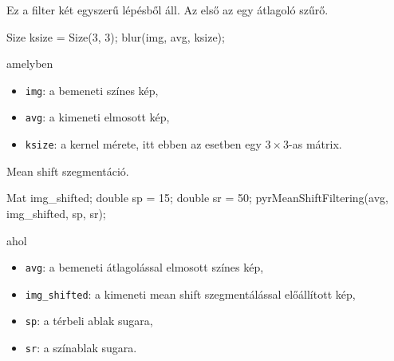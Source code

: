 Ez a filter két egyszerű lépésből áll. Az első az egy átlagoló szűrő.
\begin{cpp}
Size ksize = Size(3, 3);
blur(img, avg, ksize);
\end{cpp}
amelyben
\begin{itemize}
    \item \texttt{img}: a bemeneti színes kép,
    \item \texttt{avg}: a kimeneti elmosott kép,
    \item \texttt{ksize}: a kernel mérete, itt ebben az esetben egy $3 \times 3$-as mátrix.
\end{itemize}
Mean shift szegmentáció.
\begin{cpp}
Mat img_shifted;
double sp = 15;
double sr = 50;
pyrMeanShiftFiltering(avg, img_shifted, sp, sr);
\end{cpp}
ahol
\begin{itemize}
    \item \texttt{avg}: a bemeneti átlagolással elmosott színes kép,
    \item \texttt{img\_shifted}: a kimeneti mean shift szegmentálással előállított kép,
    \item \texttt{sp}: a térbeli ablak sugara,
    \item \texttt{sr}: a színablak sugara.
\end{itemize}
